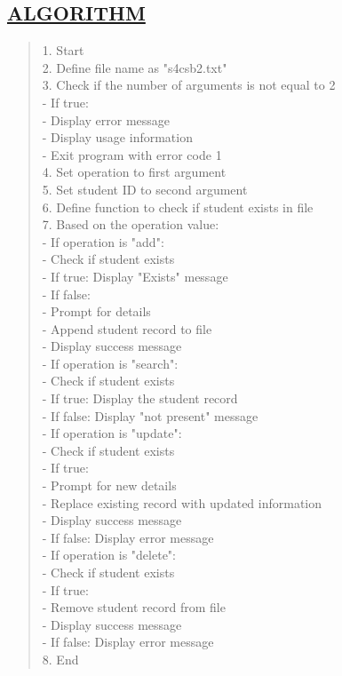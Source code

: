 \documentclass[a4paper, 12pt]{article}
\begin{document}
\subsection*{\underline{ALGORITHM}}
\begin{quote}
1. Start\\
2. Define file name as "s4csb2.txt"\\
3. Check if the number of arguments is not equal to 2\\
   - If true:\\
     - Display error message\\
     - Display usage information\\
     - Exit program with error code 1\\
4. Set operation to first argument\\
5. Set student ID to second argument\\
6. Define function to check if student exists in file\\
7. Based on the operation value:\\
   - If operation is "add":\\
     - Check if student exists\\
       - If true: Display "Exists" message\\
       - If false:\\
         - Prompt for details\\
         - Append student record to file\\
         - Display success message\\
   - If operation is "search":\\
     - Check if student exists\\
       - If true: Display the student record\\
       - If false: Display "not present" message\\
   - If operation is "update":\\
     - Check if student exists\\
       - If true:\\
         - Prompt for new details\\
         - Replace existing record with updated information\\
         - Display success message\\
       - If false: Display error message\\
   - If operation is "delete":\\
     - Check if student exists\\
       - If true:\\
         - Remove student record from file\\
         - Display success message\\
       - If false: Display error message\\
8. End\\
\end{quote}
\end{document}
